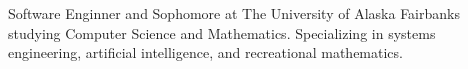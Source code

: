 ﻿Software Enginner and Sophomore at The University of Alaska Fairbanks studying Computer Science and Mathematics. Specializing in systems engineering, artificial intelligence, and recreational mathematics.